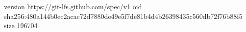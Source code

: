 version https://git-lfs.github.com/spec/v1
oid sha256:480a144b0ec2acac72d7880de49e5f7de81b4d4b26398435c560db72f76b88f5
size 196704

